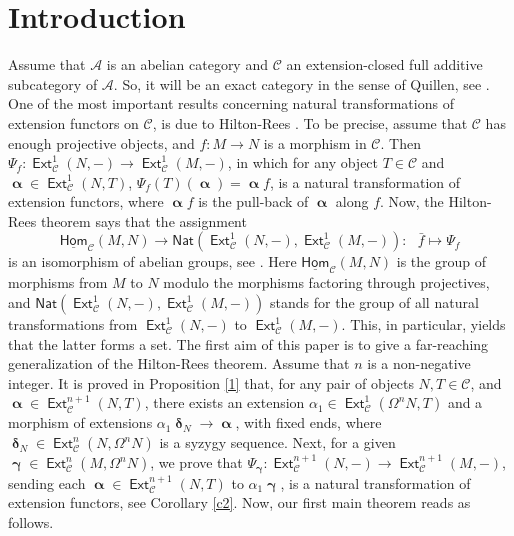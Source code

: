 \documentclass[11pt,a4paper]{amsart}
\newcommand{\rt}{\rightarrow}
\newcommand{\lrt}{\longrightarrow}
\newcommand{\C}{\mathscr{C} }
\def\Ext{\operatorname{{\mathsf{Ext}}}}
\def\uhom{\operatorname{\underline{\mathsf{Hom}}}}
\def\syz{\mathsf{\Omega}}
\def\A{\mathcal A}
\def\al{\operatorname{\boldsymbol{\alpha}}}
\def\ga{\operatorname{\boldsymbol{\gamma}}}
\def\de{\operatorname{\boldsymbol{\delta}}}
\newcommand{\nat}{{\mathsf{Nat}}}
\theoremstyle{definition}
\theoremstyle{plain}
\theoremstyle{definition}
\numberwithin{equation}{section}
\begin{document}
\tableofcontents


\section{Introduction}
Assume that $\A$ is an abelian category and $\C$ an extension-closed full additive subcategory of $\A$. So, it will be an exact category in the sense of Quillen, see \cite[Lemma 10.20]{buh}. One of the most important results concerning natural transformations of extension functors on $\C$, is due to  Hilton-Rees \cite{hr}. To be precise, assume that $\C$ has enough projective objects, and $f: M\rt N$ is a morphism in $\C$. Then $\Psi_f:\Ext^1_{\C}(N, -)\lrt\Ext^1_{\C}(M, -)$, in which for any object $T\in\C$ and $\al\in\Ext^1_{\C}(N, T)$, $\Psi_f(T)(\al)=\al f$, is a natural transformation of extension functors, where $\al f$ is the pull-back of $\al$ along $f$. Now, the Hilton-Rees theorem says that the assignment
$$\uhom_{\C}(M, N)\lrt\nat(\Ext^1_{\C}(N, -), \Ext^1_{\C}(M, -)):~~~\bar{f}\mapsto\Psi_f$$is an isomorphism of abelian groups,  see  \cite[Theorem 7]{mart}. Here $\uhom_{\C}(M, N)$ is the group of morphisms from $M$ to $N$ modulo the morphisms factoring through projectives, and  $\nat(\Ext^1_{\C}(N, -), \Ext^1_{\C}(M, -))$ stands for the group of all natural transformations from $\Ext^1_{\C}(N, -)$ to $\Ext^1_{\C}(M, -)$. This, in particular, yields that the latter forms a set. The first aim of this paper is to give a far-reaching generalization of the Hilton-Rees theorem.
Assume that $n$ is a non-negative integer. It is proved in Proposition \ref{1} that, for any pair of objects $N, T\in\C$, and $\al\in\Ext^{n+1}_{\C}(N, T)$, there exists an extension $\alpha_1\in\Ext^1_{\C}(\syz^nN, T)$ and a morphism of extensions $\alpha_1\de_N\lrt\al$, with fixed ends, where $\de_N\in\Ext^n_{\C}(N, \syz^nN)$ is a syzygy sequence. Next, for a given $\ga\in\Ext^n_{\C}(M, \syz^nN)$, we prove that $\Psi_{\ga}:\Ext^{n+1}_{\C}(N, -)\lrt\Ext^{n+1}_{\C}(M, -)$, sending each $\al\in\Ext^{n+1}_{\C}(N, T)$ to $\alpha_1\ga$, is a natural transformation of extension functors, see Corollary \ref{c2}. Now, our first main theorem reads as follows.
\end{document}
